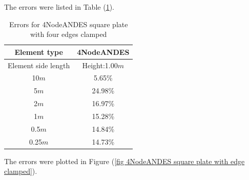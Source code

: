 \documentclass[fleqn,11pt,letter]{article}
\begin{document}
The errors were listed in Table (\ref{table Errors for 4NodeANDES square plate with four edges clamped}).

\begin{table}[H]
  \centering
    \caption{Errors for 4NodeANDES square plate with four edges clamped}
  \label{table Errors for 4NodeANDES square plate with four edges clamped}
\begin{tabular}{|c|c|}
\hline
Element type     & 4NodeANDES          \\ \hline
Element side length & Height:1.00$m$   \\ \hline
10$m$            & 5.65\%         \\ \hline
5$m$             & 24.98\%        \\ \hline
2$m$             & 16.97\%        \\ \hline
1$m$             & 15.28\%        \\ \hline
0.5$m$           & 14.84\%        \\ \hline
0.25$m$          & 14.73\%       \\
\hline
\end{tabular}
\end{table}

The errors were plotted in Figure (\ref{fig 4NodeANDES square plate with edge clamped}).
\end{document}
